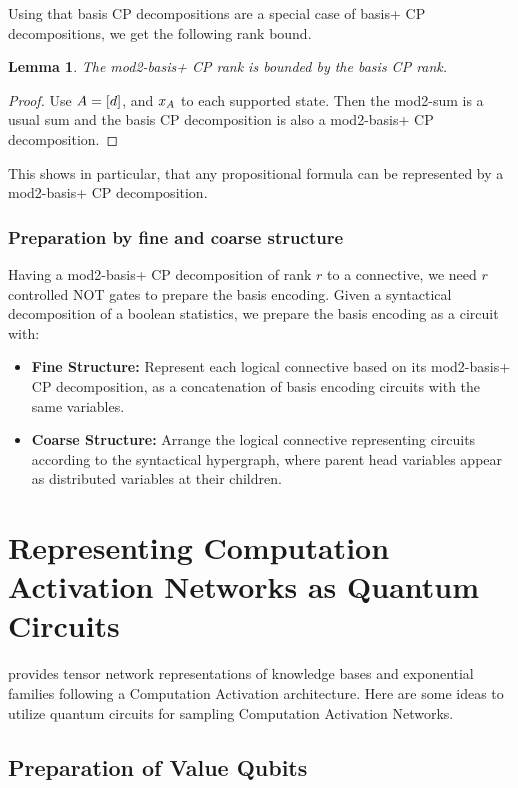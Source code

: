 \documentclass[aps,onecolumn,nofootinbib,pra]{article}
\newtheorem{lemma}{Lemma}
\begin{document}
    Using that basis CP decompositions are a special case of basis+ CP decompositions, we get the following rank bound.

    \begin{lemma}
        The mod2-basis+ CP rank is bounded by the basis CP rank.
    \end{lemma}
    \begin{proof}
        Use $A=[d]$, and $x_{A}$ to each supported state.
        Then the mod2-sum is a usual sum and the basis CP decomposition is also a mod2-basis+ CP decomposition.
    \end{proof}

    This shows in particular, that any propositional formula can be represented by a mod2-basis+ CP decomposition.

    \subsubsection{Preparation by fine and coarse structure}

    Having a mod2-basis+ CP decomposition of rank $r$ to a connective, we need $r$ controlled NOT gates to prepare the basis encoding.
    Given a syntactical decomposition of a boolean statistics, we prepare the basis encoding as a circuit with:
    \begin{itemize}
        \item \textbf{Fine Structure:} Represent each logical connective based on its mod2-basis+ CP decomposition, as a concatenation of basis encoding circuits with the same variables.
        \item \textbf{Coarse Structure:} Arrange the logical connective representing circuits according to the syntactical hypergraph, where parent head variables appear as distributed variables at their children.
    \end{itemize}


    \section{Representing Computation Activation Networks as Quantum Circuits}

    \tnreason provides tensor network representations of knowledge bases and exponential families following a Computation Activation architecture.
    Here are some ideas to utilize quantum circuits for sampling Computation Activation Networks.

    \subsection{Preparation of Value Qubits}
\end{document}

